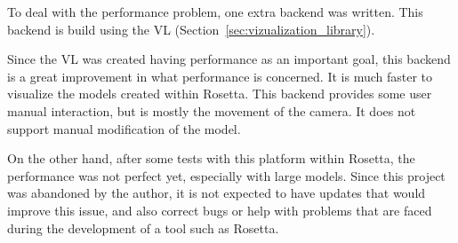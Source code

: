 To deal with the performance problem, one extra backend was written. This backend is build using the \gls{VL} (Section~\ref{sec:vizualization_library}).

Since the \gls{VL} was created having performance as an important goal, this backend is a great improvement in what performance is concerned. It is much faster to visualize the models created within Rosetta.
This backend provides some user manual interaction, but is mostly the movement of the camera. It does not support manual modification of the model.

On the other hand, after some tests with this platform within Rosetta, the performance was not perfect yet, especially with large models. Since this project was abandoned by the author, it is not expected to have updates that would improve this issue, and also correct bugs or help with problems that are faced during the development of a tool such as Rosetta.







		